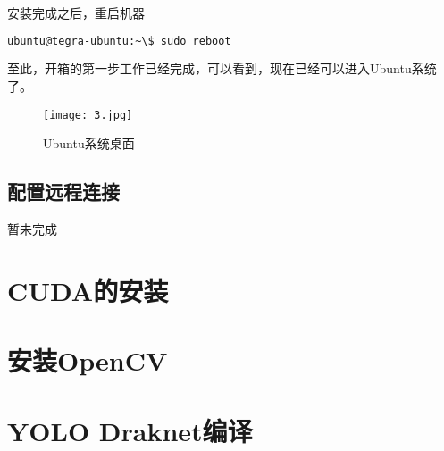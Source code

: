 \documentclass[openany]{ctexbook}
\begin{document}
安装完成之后，重启机器
{\setmainfont{Courier New Bold}                          %
\begin{lstlisting}[language=bash]
ubuntu@tegra-ubuntu:~\$ sudo reboot
\end{lstlisting}}

至此，开箱的第一步工作已经完成，可以看到，现在已经可以进入Ubuntu系统了。
\begin{figure}[h]
  \centering
  \texttt{[image: 3.jpg]}
  \caption{Ubuntu系统桌面}
\end{figure}

\section{配置远程连接}
暂未完成



\chapter{CUDA的安装}
\chapter{安装OpenCV}
\chapter{YOLO Draknet编译}
\end{document}
